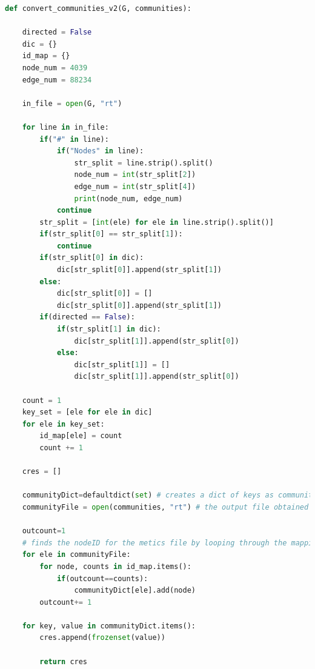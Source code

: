 \documentclass[letterpaper, 11pt]{article}
\newcommand{\1}{\mathds{1}}	%
\theoremstyle{definition}
\begin{document}
\begin{lstlisting}[language=python, caption={Functions for output formats}, label={lst:Pycode}]
def convert_communities_v2(G, communities):

    directed = False 
    dic = {}
    id_map = {} 
    node_num = 4039
    edge_num = 88234

    in_file = open(G, "rt")

    for line in in_file:
        if("#" in line):
            if("Nodes" in line):
                str_split = line.strip().split()
                node_num = int(str_split[2])
                edge_num = int(str_split[4])
                print(node_num, edge_num)
            continue
        str_split = [int(ele) for ele in line.strip().split()]
        if(str_split[0] == str_split[1]):
            continue
        if(str_split[0] in dic):
            dic[str_split[0]].append(str_split[1])
        else:
            dic[str_split[0]] = []
            dic[str_split[0]].append(str_split[1])
        if(directed == False):
            if(str_split[1] in dic):
                dic[str_split[1]].append(str_split[0])
            else:
                dic[str_split[1]] = []
                dic[str_split[1]].append(str_split[0])

    count = 1 
    key_set = [ele for ele in dic]
    for ele in key_set:
        id_map[ele] = count
        count += 1

    cres = []

    communityDict=defaultdict(set) # creates a dict of keys as community number and values as set of nodeIDs belonging to that community
    communityFile = open(communities, "rt") # the output file obtained from community detection algorithm is given in argv[2]

    outcount=1
    # finds the nodeID for the metics file by looping through the mapping dictionary of the metis file
    for ele in communityFile:
        for node, counts in id_map.items():
            if(outcount==counts):
                communityDict[ele].add(node)
        outcount+= 1

    for key, value in communityDict.items():
        cres.append(frozenset(value))

        return cres
\end{lstlisting}
\end{document}
